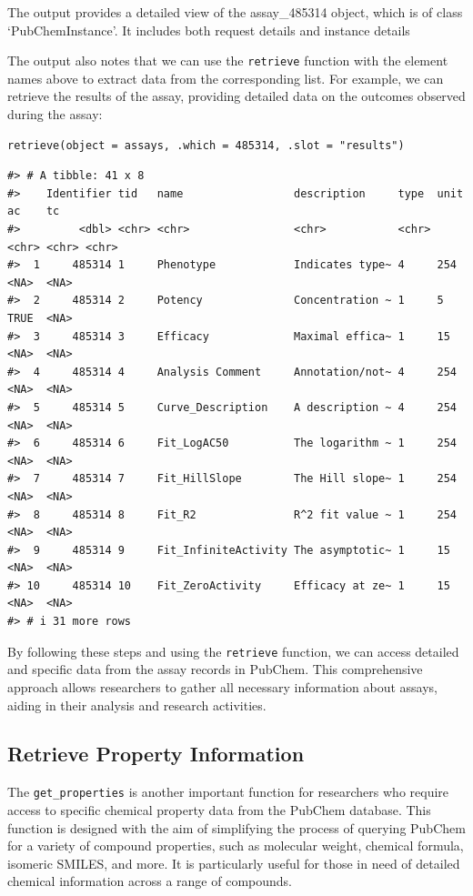 The output provides a detailed view of the assay\_485314 object, which is of class `PubChemInstance'. It includes both request details and instance details

The output also notes that we can use the \texttt{retrieve} function with the element names above to extract data from the corresponding list. For example, we can retrieve the results of the assay, providing detailed data on the outcomes observed during the assay:

\begin{verbatim}
retrieve(object = assays, .which = 485314, .slot = "results")
\end{verbatim}

\begin{verbatim}
#> # A tibble: 41 x 8
#>    Identifier tid   name                 description     type  unit  ac    tc   
#>         <dbl> <chr> <chr>                <chr>           <chr> <chr> <chr> <chr>
#>  1     485314 1     Phenotype            Indicates type~ 4     254   <NA>  <NA> 
#>  2     485314 2     Potency              Concentration ~ 1     5     TRUE  <NA> 
#>  3     485314 3     Efficacy             Maximal effica~ 1     15    <NA>  <NA> 
#>  4     485314 4     Analysis Comment     Annotation/not~ 4     254   <NA>  <NA> 
#>  5     485314 5     Curve_Description    A description ~ 4     254   <NA>  <NA> 
#>  6     485314 6     Fit_LogAC50          The logarithm ~ 1     254   <NA>  <NA> 
#>  7     485314 7     Fit_HillSlope        The Hill slope~ 1     254   <NA>  <NA> 
#>  8     485314 8     Fit_R2               R^2 fit value ~ 1     254   <NA>  <NA> 
#>  9     485314 9     Fit_InfiniteActivity The asymptotic~ 1     15    <NA>  <NA> 
#> 10     485314 10    Fit_ZeroActivity     Efficacy at ze~ 1     15    <NA>  <NA> 
#> # i 31 more rows
\end{verbatim}

By following these steps and using the \texttt{retrieve} function, we can access detailed and specific data from the assay records in PubChem. This comprehensive approach allows researchers to gather all necessary information about assays, aiding in their analysis and research activities.

\hypertarget{retrieve-property-information}{%
\subsection{Retrieve Property Information}\label{retrieve-property-information}}

The \texttt{get\_properties} is another important function for researchers who require access to specific chemical property data from the PubChem database. This function is designed with the aim of simplifying the process of querying PubChem for a variety of compound properties, such as molecular weight, chemical formula, isomeric SMILES, and more. It is particularly useful for those in need of detailed chemical information across a range of compounds.

